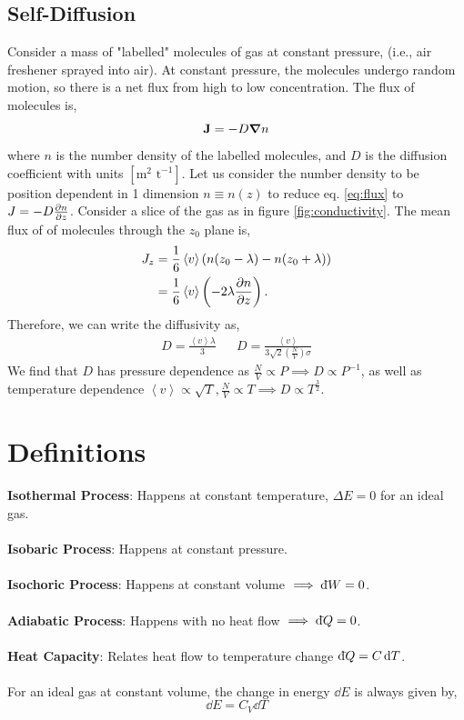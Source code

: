 \documentclass{book}
\newcommand{\dbar}{\mathrm{d}\hspace*{-0.08em}\bar{}\hspace*{0.1em}}
\begin{document}
\section{Self-Diffusion}
Consider a mass of "labelled" molecules of gas at constant pressure, (i.e., air freshener sprayed into air). At constant pressure, the molecules undergo random motion, so there is a net flux from high to low concentration. The flux of molecules is,
\begin{equation}
	\vb{J} = -D \grad n \label{eq:flux}
\end{equation}
where $n$ is the number density of the labelled molecules, and $D$ is the diffusion coefficient with units $\left[\text{m}^2 \text{ t}^{-1}\right]$. Let us consider the number density to be position dependent in 1 dimension $n \equiv n(z)$ to reduce eq. \eqref{eq:flux} to $J=-D\pdv{n}{z}$. Consider a slice of the gas as in figure \ref{fig:conductivity}. The mean flux of of molecules through the $z_0$ plane is,
\begin{equation}
	\begin{split}
		J_z & = \frac{1}{6}\left<v\right>\left(n(z_0 - \lambda) - n(z_0 + \lambda)\right)\\
		& = \frac{1}{6}\left<v\right>\left(-2\lambda\pdv{n}{z}\right).
	\end{split}
\end{equation}
Therefore, we can write the diffusivity as,
\begin{align}
	\boxed{D = \frac{\left<v\right>\lambda}{3}} && \boxed{D = \frac{\left<v\right>}{3\sqrt{2}\left(\frac{N}{V}\right)\sigma}}
\end{align}
We find that $D$ has pressure dependence as $\frac{N}{V} \propto P \implies D \propto P^{-1}$, as well as temperature dependence $\left<v\right> \propto \sqrt{T}, \frac{N}{V}\propto T \implies D \propto T^{\frac{3}{2}}$.
\appendix
\chapter{Definitions}
\textbf{Isothermal Process}:  Happens at constant temperature, $\Delta E = 0$ for an ideal gas.
\\\\
\textbf{Isobaric Process}: Happens at constant pressure.
\\\\
\textbf{Isochoric Process}: Happens at constant volume $\implies \dbar W = 0$.
\\\\
\textbf{Adiabatic Process}: Happens with no heat flow $\implies \dbar Q = 0$.
\\\\
\textbf{Heat Capacity}: Relates heat flow to temperature change $\dbar Q = C \dd{T}$.
\\\\
For an ideal gas at constant volume, the change in energy $\dd{E}$ is always given by,
\begin{equation}
	\dd{E} = C_V \dd{T}
\end{equation}
\end{document}
